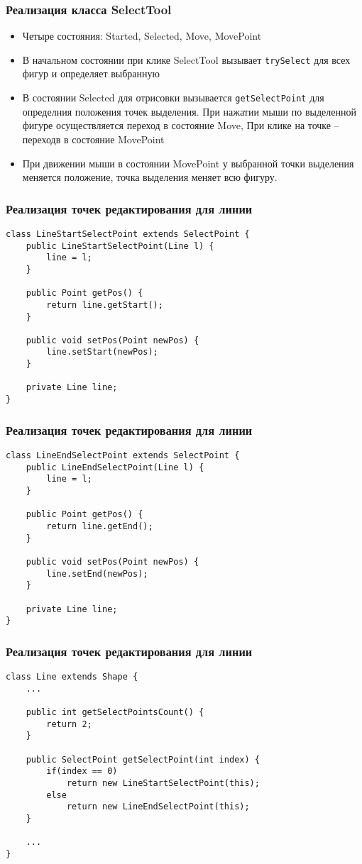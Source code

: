 \documentclass[handout]{beamer}
\begin{document}
\begin{frame}[fragile]
\frametitle{Реализация класса SelectTool}
\begin{itemize}
\item Четыре состояния: Started, Selected, Move, MovePoint
\item В начальном состоянии при клике SelectTool вызывает \lstinline{trySelect} для всех
      фигур и определяет выбранную
\item В состоянии Selected для отрисовки вызывается \lstinline{getSelectPoint} для определния
      положения точек выделения. При нажатии мыши по выделенной фигуре осуществляется переход
      в состояние Move, При клике на точке -- переходв в состояние MovePoint
\item При движении мыши в состоянии MovePoint у выбранной точки выделения меняется положение,
      точка выделения меняет всю фигуру.
\end{itemize}
\end{frame}


\begin{frame}[fragile]
\frametitle{Реализация точек редактирования для линии}
\begin{lstlisting}
class LineStartSelectPoint extends SelectPoint {
    public LineStartSelectPoint(Line l) {
        line = l;
    }

    public Point getPos() {
        return line.getStart();
    }

    public void setPos(Point newPos) {
        line.setStart(newPos);
    }

    private Line line;
}
\end{lstlisting}
\end{frame}


\begin{frame}[fragile]
\frametitle{Реализация точек редактирования для линии}
\begin{lstlisting}
class LineEndSelectPoint extends SelectPoint {
    public LineEndSelectPoint(Line l) {
        line = l;
    }

    public Point getPos() {
        return line.getEnd();
    }

    public void setPos(Point newPos) {
        line.setEnd(newPos);
    }

    private Line line;
}
\end{lstlisting}
\end{frame}


\begin{frame}[fragile]
\frametitle{Реализация точек редактирования для линии}
\begin{lstlisting}
class Line extends Shape {
    ...
    
    public int getSelectPointsCount() {
        return 2;
    }

    public SelectPoint getSelectPoint(int index) {
        if(index == 0)
            return new LineStartSelectPoint(this);
        else
            return new LineEndSelectPoint(this);
    }

    ...
}
\end{lstlisting}
\end{frame}
\end{document}
